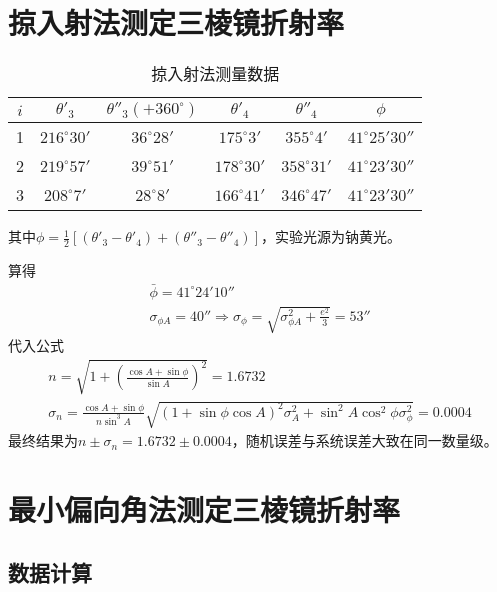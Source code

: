 \documentclass[12pt, a4paper]{ctexart}
\begin{document}
\section{掠入射法测定三棱镜折射率}

\begin{table}[htbp]
  \centering
  \caption{掠入射法测量数据}
    \begin{tabular}{cccccc}
    \toprule
    $i$ & $\theta'_3$ & $\theta''_3(+ 360^{\circ})$ & $\theta'_4$ & $\theta''_4$ &$\phi$ \\
    \midrule
    1     & $216^{\circ}30'$ & $36^{\circ}28'$ & $175^{\circ}3'$  & $355^{\circ}4'$  & $41^{\circ}25'30''$ \\
    2     & $219^{\circ}57'$ & $39^{\circ}51'$ & $178^{\circ}30'$ & $358^{\circ}31'$ & $41^{\circ}23'30''$ \\
    3     & $208^{\circ}7'$  & $28^{\circ}8'$  & $166^{\circ}41'$ & $346^{\circ}47'$ & $41^{\circ}23'30''$ \\
    \bottomrule
    \end{tabular}
  \label{tab:t2}
\end{table}
其中$\phi = \frac12 [(\theta'_3 - \theta'_4) + (\theta''_3 - \theta''_4)]$，实验光源为钠黄光。

算得
\begin{gather*}
    \bar{\phi} = 41^{\circ}24'10'' \\
    \sigma_{\phi A} = 40'' \Rightarrow \sigma_{\phi} = \sqrt{\sigma_{\phi A}^2 + \frac{e^2}{3}} = 53''
\end{gather*}
代入公式
\begin{gather*}
  n = \sqrt{1 + (\frac{\cos A + \sin \phi}{\sin A})^2} = 1.6732\\
  \sigma_n = \frac{\cos A + \sin \phi}{n \sin^3 A} \sqrt{(1 + \sin \phi \cos A)^2 \sigma_A^2 + \sin^2 A \cos^2 \phi \sigma_{\phi}^2} = 0.0004
\end{gather*}
最终结果为$n \pm \sigma_n = 1.6732 \pm 0.0004$，随机误差与系统误差大致在同一数量级。

\section{最小偏向角法测定三棱镜折射率}
\subsection{数据计算}
\end{document}
